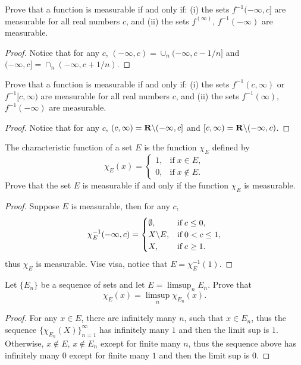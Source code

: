 \begin{pro}%
	Prove that a function is measurable if and only if: (i) the sets $f^{-1}(-\infty,c]$ are measurable for all real numbers $c$, and (ii) the sets $f^(\infty)$, $f^{-1}(-\infty)$ are measurable.
\end{pro}
\begin{proof}
	Notice that for any $c$, $(-\infty,c)=\cup_n (-\infty,c-1/n]$ and $(-\infty,c]=\cap_n (-\infty,c+1/n)$.
\end{proof}

\begin{pro}%
	Prove that a function is measurable if and only if: (i) the sets $f^{-1}(c,\infty)$ or $f^{-1}[c,\infty)$ are measurable for all real numbers $c$, and (ii) the sets $f^{-1}(\infty)$, $f^{-1}(-\infty)$ are measurable.
\end{pro}
\begin{proof}
	Notice that for any $c$, $(c,\infty)=\mathbf{R}\backslash(-\infty,c]$ and $[c,\infty)=\mathbf{R}\backslash(-\infty,c)$.
\end{proof}

\begin{pro}%
	The characteristic function of a set $E$ is the function $\chi_E$ defined by
	\[\chi_E(x)=\begin{cases}1,&\mbox{if}\;x\in E,\\0,&\mbox{if}\;x\notin E.\end{cases}\]
	Prove that the set $E$ is measurable if and only if the function $\chi_E$ is measurable.
\end{pro}
\begin{proof}
	Suppose $E$ is measurable, then for any $c$,
	\[\chi_E^{-1}(-\infty,c)=
	\begin{cases}
		\emptyset,&\mbox{if}\;c\leq 0,\\
		X\backslash E,&\mbox{if}\;0<c\leq 1,\\
		X,&\mbox{if}\;c\geq 1.
	\end{cases}\]thus $\chi_E$ is measurable. Vise visa, notice that $E=\chi_E^{-1}(1)$.
\end{proof}

\begin{pro}%
	Let $\{E_n\}$ be a sequence of sets and let $E=\limsup_n E_n$. Prove that
	\[\chi_E(x)=\limsup_n \chi_{E_n}(x).\]
\end{pro}
\begin{proof}
	For any $x\in E$, there are infinitely many $n$, such that $x\in E_n$, thus the sequence $\{\chi_{E_n}(X)\}_{n=1}^\infty$ has infinitely many $1$ and then the limit sup is $1$. Otherwise, $x\notin E$, $x\notin E_n$ except for finite many $n$, thus the sequence above has infinitely many $0$ except for finite many $1$ and then the limit sup is $0$.
\end{proof}

